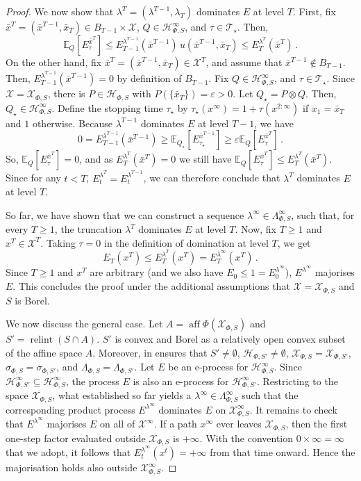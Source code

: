 \documentclass[10pt, a4paper]{article}
\newcommand{\E}{\mathbb E}
\newcommand{\Hh}{\mathcal H}
\newcommand{\HhP}{\Hh_{\Phi,S}}
\newcommand{\LP}{\Lambda_{\Phi,S}}
\newcommand{\sP}{\sigma_{\Phi,S}}
\newcommand{\T}{\mathcal T}
\newcommand{\X}{\mathcal X}
\newcommand{\XP}{\X_{\Phi,S}}
\DeclareMathOperator{\aff}{aff}
\DeclareMathOperator{\relint}{relint}
\begin{document}
\begin{proof}
    We now show that $\lambda^T = (\lambda^{T-1},\lambda_T)$ dominates $E$ at level $T$. First, fix $\bar x^T = (\bar x^{T-1},\bar x_T)\in B_{T-1}\times\X$, $Q\in\HhP^\infty$, and $\tau\in\T_\star$. Then, 
    $$\E_Q[E^{\bar x^T}_\tau] \leq E_{T-1}^{\lambda^{T-1}}(\bar x^{T-1})\, u(\bar x^{T-1},\bar x_T)\leq E_T^{\lambda^T}(\bar x^T)\,.$$
    On the other hand, fix $\bar x^{T} = (\bar x^{T-1}, \bar x_T) \in\X^T$, and assume that $\bar x^{T-1}\notin B_{T-1}$. Then, $E^{\lambda^{T-1}}_{T-1}(\bar x^{T-1})=0$ by definition of $B_{T-1}$. Fix  $Q\in\HhP^\infty$, and $\tau\in\T_\star$. Since $\X=\XP$,  there is $P\in\HhP$ with $P(\{\bar x_T\})=\varepsilon>0$. Let $Q_\star = P\otimes Q$. Then, $Q_\star\in\HhP^\infty$. Define the stopping time $\tau_\star$ by $\tau_\star(x^\infty) = 1 + \tau(x^{2:\infty})$ if $x_1 = \bar x_T$ and $1$ otherwise. Because $\lambda^{T-1}$ dominates $E$ at level $T-1$, we have
    $$0 = E_{T-1}^{\lambda^{T-1}}(\bar x^{T-1}) \geq \E_{Q_\star}[E^{\bar x^{T-1}}_{\tau_\star}] \geq \varepsilon \E_Q[E^{\bar x^T}_\tau]\,.$$
    So, $\E_Q[E^{\bar x^T}_\tau] = 0$, and as $E_T^{\lambda^T}(\bar x^T) = 0$ we still have $\E_Q[E_\tau^{\bar x^T}]\leq E_T^{\lambda^T}(\bar x^T)$. Since for any $t<T$, $E^{\lambda^T}_t = E^{\lambda^{T-1}}_t$, we can therefore conclude that $\lambda^T$ dominates $E$ at level $T$. 

    So far, we have shown that we can construct a sequence $\lambda^\infty\in\LP^\infty$, such that, for every $T\geq 1$, the truncation $\lambda^T$ dominates $E$ at level $T$. Now,  fix $T\geq 1$ and $x^T\in\X^T$. Taking $\tau = 0$ in the definition of domination at level $T$, we get
    $$E_T(x^T) \leq E_T^{\lambda^T}(x^T) = E_T^{\lambda^\infty}(x^T)\,.$$
    Since $T\geq1$ and $x^T$ are arbitrary (and we also have $E_0 \leq 1 = E^{\lambda^\infty}_0$), $E^{\lambda^\infty}$ majorises $E$. This concludes the proof under the additional assumptions that  $\X = \XP$ and $S$ is Borel.

    We now discuss the general case. Let $A=\aff\Phi(\XP)$ and $S'=\relint(S\cap A)$. $S'$ is convex and Borel as a relatively open convex subset of the affine space $A$. Moreover,  in  ensures that $S'\neq\emptyset$, $\Hh_{\Phi,S'}\neq\emptyset$, $\XP = \X_{\Phi,S'}$, $\sP = \sigma_{\Phi,S'}$, and $\LP = \Lambda_{\Phi,S'}$. Let $E$ be an e-process for $\HhP^\infty$. Since $\Hh_{\Phi,S'}^\infty\subseteq\HhP^\infty$, the process $E$ is also an e-process for $\Hh_{\Phi,S'}^\infty$. Restricting to the space $\XP$, what established so far yields a $\lambda^\infty\in\LP^\infty$ such that the corresponding product process $E^{\lambda^\infty}$ dominates $E$ on $\XP^\infty$. It remains to check that $E^{\lambda^\infty}$ majorises $E$ on all of $\X^\infty$. If a path $x^\infty$ ever leaves $\XP$, then the first one-step factor evaluated outside $\XP$ is $+\infty$. With the convention $0\times\infty=\infty$ that we adopt, it follows that $E_t^{\lambda^\infty}(x^t)=+\infty$ from that time onward. Hence the majorisation holds also outside $\XP^\infty$. 
    \end{proof}
\end{document}
